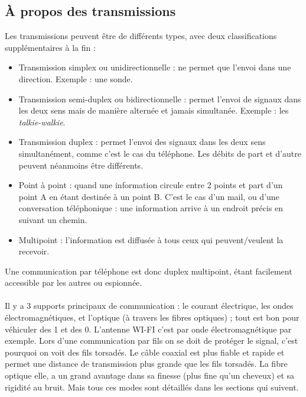 \documentclass[12pt,a4paper]{report}
\begin{document}
\subsection{À propos des transmissions}
Les transmissions peuvent être de différents types, avec deux classifications supplémentaires à la fin :
\begin{itemize}
\item Transmission simplex ou unidirectionnelle : ne permet que l'envoi dans une direction. Exemple : une sonde.
\item Transmission semi-duplex ou bidirectionnelle : permet l'envoi de signaux dans les deux sens mais de manière alternée et jamais simultanée. Exemple : les \textit{talkie-walkie}.
\item  Transmission duplex : permet l'envoi des signaux dans les deux sens simultanément, comme c'est le cas du téléphone. Les débits de part et d'autre peuvent néanmoins être différents.
\item Point à point : quand une information circule entre 2 points et part d'un point A en étant destinée à un point B. C'est le cas d'un mail, ou d'une conversation téléphonique : une information arrive à un endroit précis en suivant un chemin.
\item Multipoint : l'information est diffusée à tous ceux qui peuvent/veulent la recevoir.
\end{itemize}
Une communication par téléphone est donc duplex multipoint, étant facilement accessible par les autres ou espionnée.\\
\\
Il y a 3 supports principaux de communication : le courant électrique, les ondes électromagnétiques, et l'optique (à travers les fibres optiques) ; tout est bon pour véhiculer des 1 et des 0. L'antenne WI-FI c'est par onde électromagnétique par exemple. 
Lors d'une communication par fils on se doit de protéger le signal, c'est pourquoi on voit des fils torsadés. Le câble coaxial est plus fiable et rapide et permet une distance de transmission plus grande que les fils torsadés. La fibre optique elle, a un grand avantage dans sa finesse (plus fine qu'un cheveux) et sa rigidité au bruit. Mais tous ces modes sont détaillés dans les sections qui suivent.
\end{document}
